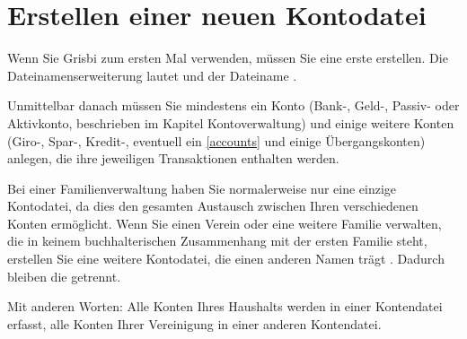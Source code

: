 \section{Erstellen einer neuen Kontodatei\label{start-newfile}}

Wenn Sie Grisbi zum ersten Mal verwenden, müssen Sie eine erste  erstellen. Die \gls{Dateinamenserweiterung} lautet  und der Dateiname .%

Unmittelbar danach müssen Sie mindestens ein Konto (Bank-, Geld-, Passiv- oder Aktivkonto, beschrieben im Kapitel Kontoverwaltung) und einige weitere Konten (Giro-, Spar-, Kredit-, eventuell ein \vref{accounts}  und einige Übergangskonten) anlegen, die ihre jeweiligen Transaktionen enthalten werden.%

Bei einer Familienverwaltung haben Sie normalerweise nur eine einzige Kontodatei, da dies den gesamten Austausch zwischen Ihren verschiedenen Konten ermöglicht. Wenn Sie einen Verein oder eine weitere Familie verwalten, die in keinem buchhalterischen Zusammenhang mit der ersten Familie steht, erstellen Sie eine weitere Kontodatei, die einen anderen Namen trägt . Dadurch bleiben die  getrennt. %

Mit anderen Worten: Alle Konten Ihres Haushalts werden in einer Kontendatei erfasst, alle Konten Ihrer Vereinigung in einer anderen Kontendatei.

